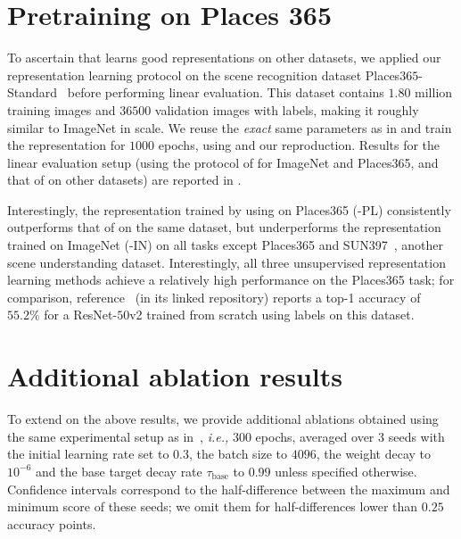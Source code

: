 \section{Pretraining on Places 365}
\label{app:train-places}
To ascertain that \algo learns good representations on other datasets, we applied our representation learning protocol on the scene recognition dataset Places$365$-Standard~\cite{zhou2017places} before performing linear evaluation. This dataset contains $1.80$ million training images and $36500$ validation images with labels, making it roughly similar to ImageNet in scale. We reuse the \emph{exact} same parameters as in  and train the representation for $1000$ epochs, using \algo and our \simclr reproduction. Results for the linear evaluation setup (using the protocol of  for ImageNet and Places365, and that of  on other datasets) are reported in .

Interestingly, the representation trained by using \algo on Places365 (\algo-PL) consistently outperforms that of \simclr on the same dataset, but underperforms the \algo representation trained on ImageNet (\algo-IN) on all tasks except Places365 and SUN397~\cite{sun397}, another scene understanding dataset. Interestingly, all three unsupervised representation learning methods achieve a relatively high performance on the Places365 task; for comparison, reference~\cite{zhou2017places} (in its linked repository) reports a top-1 accuracy of $55.2\%$ for a ResNet-$50$v2 trained from scratch using labels on this dataset.

\begin{table}[ht]
    \small
    \centering
     
     \vspace{1em}
    \captionsetup{width=.9\linewidth} 
     \caption{Transfer learning results (linear evaluation, ResNet-$50$) from Places365 (PL). For comparison purposes, we also report the results from \algo trained on ImageNet (\algo-IN).}
     \label{tab:transfer_learning_from_places}
\vspace{-1.4em}
\end{table}

\section{Additional ablation results}\label{sec:additional_ablation_results}
To extend on the above results, we provide additional ablations obtained using the same experimental setup as in~, \emph{i.e.,} 300 epochs, averaged over $3$ seeds with the initial learning rate set to $0.3$, the batch size to $4096$, the weight decay to $10^{-6}$ and the base target decay rate $\tau_\text{base}$ to $0.99$ unless specified otherwise. Confidence intervals correspond to the half-difference between the maximum and minimum score of these seeds; we omit them for half-differences lower than $0.25$ accuracy points.

